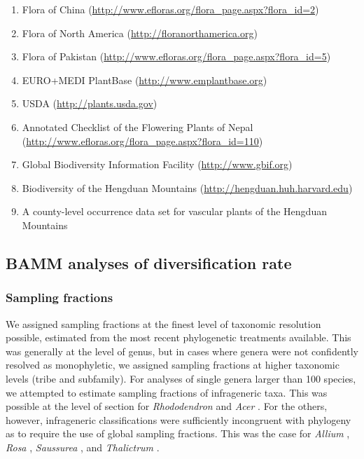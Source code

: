\begin{enumerate}
\item Flora of China
  (\href{http://www.efloras.org/flora_page.aspx?flora_id=2}{http://www.efloras.org/flora\_page.aspx?flora\_id=2})
\item Flora of North
  America (\href{http://floranorthamerica.org}{http://floranorthamerica.org})
\item Flora of Pakistan
  (\href{http://www.efloras.org/flora\_page.aspx?flora\_id=5}{http://www.efloras.org/flora\_page.aspx?flora\_id=5})
\item EURO+MEDI PlantBase
  (\href{http://www.emplantbase.org}{http://www.emplantbase.org})
\item USDA (\href{http://plants.usda.gov}{http://plants.usda.gov})
\item Annotated Checklist of the Flowering Plants of Nepal
  (\href{http://www.efloras.org/flora\_page.aspx?flora\_id=110}{http://www.efloras.org/flora\_page.aspx?flora\_id=110})
\item Global Biodiversity Information Facility
  (\href{http://www.gbif.org}{http://www.gbif.org})
\item Biodiversity of the Hengduan Mountains
  (\href{http://hengduan.huh.harvard.edu}{http://hengduan.huh.harvard.edu})
\item A county-level occurrence data set for vascular plants of the
  Hengduan Mountains \citep{Zhang2009,Wu2008}
\end{enumerate}

\subsection*{BAMM analyses of diversification rate}

\subsubsection*{Sampling fractions}

We assigned sampling fractions at the finest level of taxonomic
resolution possible, estimated from the most recent phylogenetic
treatments available. This was generally at the level of genus, but in
cases where genera were not confidently resolved as monophyletic, we
assigned sampling fractions at higher taxonomic levels (tribe and
subfamily). For analyses of single genera larger than 100 species, we
attempted to estimate sampling fractions of infrageneric taxa. This
was possible at the level of section for \textit{Rhododendron}
\citep{fang1998} and \textit{Acer} \citep{xu2008}. For the others,
however, infrageneric classifications were sufficiently incongruent
with phylogeny as to require the use of global sampling
fractions. This was the case for \textit{Allium} \citep{li2010},
\textit{Rosa} \citep{bruneau2007}, \textit{Saussurea}
\citep{wang2009}, and \textit{Thalictrum} \citep{soza2012}.

